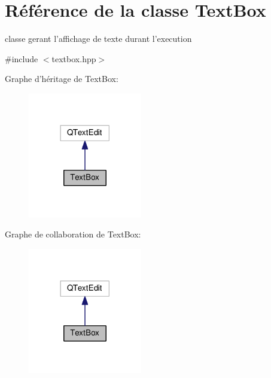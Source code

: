 \hypertarget{classTextBox}{\section{Référence de la classe Text\+Box}
\label{classTextBox}
}


classe gerant l'affichage de texte durant l'execution  




{\ttfamily \#include $<$textbox.\+hpp$>$}



Graphe d'héritage de Text\+Box\+:\nopagebreak
\begin{figure}[H]
\begin{center}
\leavevmode
\includegraphics[width=141pt]{classTextBox__inherit__graph}
\end{center}
\end{figure}


Graphe de collaboration de Text\+Box\+:\nopagebreak
\begin{figure}[H]
\begin{center}
\leavevmode
\includegraphics[width=141pt]{classTextBox__coll__graph}
\end{center}
\end{figure}
